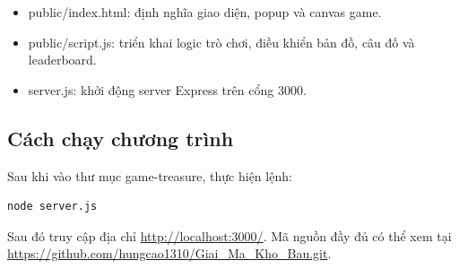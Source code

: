 \begin{itemize}
    \item public/index.html: định nghĩa giao diện, popup và canvas game.
    \item public/script.js: triển khai logic trò chơi, điều khiển bản đồ, câu đố và leaderboard.
    \item server.js: khởi động server Express trên cổng 3000.
\end{itemize}

\subsection{Cách chạy chương trình}

Sau khi vào thư mục game-treasure, thực hiện lệnh:

\begin{verbatim}
node server.js
\end{verbatim}

Sau đó truy cập địa chỉ \url{http://localhost:3000/}. Mã nguồn đầy đủ có thể xem tại \url{https://github.com/hungcao1310/Giai_Ma_Kho_Bau.git}.